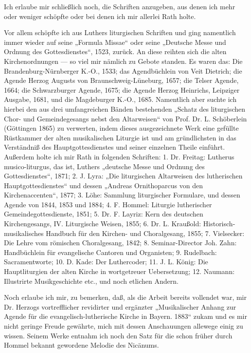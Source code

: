 Ich erlaube mir schließlich noch, die Schriften anzugeben, aus denen ich mehr oder weniger schöpfte oder bei denen ich mir allerlei Rath holte.

Vor allem schöpfte ich aus Luthers liturgischen Schriften und ging namentlich immer wieder auf seine „Formula Missae“ oder seine „Deutsche Messe und Ordnung des Gottesdienstes“, 1523, zurück. An diese reihten sich die alten Kirchenordnungen — so viel mir nämlich zu Gebote standen. Es waren das: Die Brandenburg-Nürnberger K.-O., 1533; das Agendbüchlein von Veit Dietrich; die Agende Herzog Augusts von Braunschweig-Lüneburg, 1657; die Telser Agende, 1664; die Schwarzburger Agende, 1675; die Agende Herzog Heinrichs, Leipziger Ausgabe, 1681, und die Magdeburger K.-O., 1685. Namentlich aber suchte ich hierbei den aus drei umfangreichen Bänden bestehenden „Schatz des liturgischen Chor- und Gemeindegesangs nebst den Altarweisen“ von Prof. Dr. L. Schöberlein (Göttingen 1865) zu verwerten, indem dieses ausgezeichnete Werk eine gefüllte Rüstkammer der alten musikalischen Liturgie ist und am gründlichsten in das Verständniß des Hauptgottesdienstes und seiner einzelnen Theile einführt. Außerdem holte ich mir Rath in folgenden Schriften: 1. Dr. Freitag: Lutherus musico-liturgus, das ist, Luthers „deutsche Messe und Ordnung des Gottesdienstes“, 1871; 2. J. Lyra: „Die liturgischen Altarweisen des lutherischen Hauptgottesdienstes“ und dessen „Andreas Ornithoparcus von den Kirchenaccenten“, 1877; 3. Löhe: Sammlung liturgischer Formulare, und dessen Agende von 1844, 1853 und 1884; 4. F. Hommel: Liturgie lutherischer Gemeindegottesdienste, 1851; 5. Dr. F. Layriz: Kern des deutschen Kirchengesangs, IV. Liturgische Weisen, 1855; 6. Dr. L. Kraußold: Historisch-musikalisches Handbuch für den Kirchen- und Choralgesang, 1855; 7. Vielsecker: Die Lehre vom römischen Choralgesang, 1842; 8. Seminar-Director Joh. Zahn: Handbüchlein für evangelische Cantoren und Organisten; 9. Rudelbach: Sacramentworte;
10. D. Kade: Der Luthercoder; 11. J. L. König: Die Hauptliturgien der alten Kirche in wortgetreuer Uebersetzung; 12. Naumann: Illustrirte Musikgeschichte etc., und noch etlichen Andern.

Noch erlaube ich mir, zu bemerken, daß, als die Arbeit bereits vollendet war, mir Dr. Herzogs vortrefflicher revidirter und ergänzter „Musikalischer Anhang zur Agende für die evangelisch-lutherische Kirche in Bayern. 1883“ zukam und es mir nicht geringe Freude gewährte, mich mit dessen Anschauungen allewege einig zu wissen. Seinem Werke entnahm ich noch den Satz für die schon früher durch Hommel bekannt gewordene Melodie des Nicänums.

